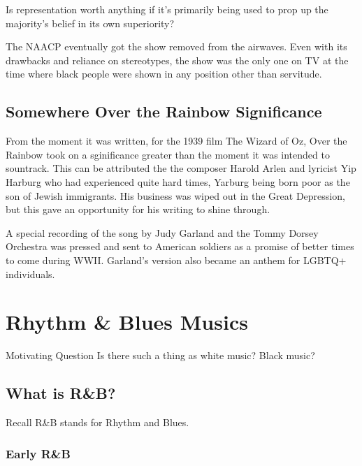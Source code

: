 \documentclass[12pt, a4paper, twoside, openright, titlepage]{book}
\begin{document}
\begin{qst}{}{}
    Is representation worth anything if it's primarily being used to prop up the majority's belief in its own superiority?
\end{qst}

The NAACP eventually got the show removed from the airwaves. Even with its drawbacks and reliance on stereotypes, the show was the only one on TV at the time where black people were shown in any position other than servitude.





\section{Somewhere Over the Rainbow Significance}

From the moment it was written, for the 1939 film The Wizard of Oz, Over the Rainbow took on a sginificance greater than the moment it was intended to sountrack. This can be attributed the the composer Harold Arlen and lyricist Yip Harburg who had experienced quite hard times, Yarburg being born poor as the son of Jewish immigrants. His business was wiped out in the Great Depression, but this gave an opportunity for his writing to shine through.

A special recording of the song by Judy Garland and the Tommy Dorsey Orchestra was pressed and sent to American soldiers as a promise of better times to come during WWII. Garland's version also became an anthem for LGBTQ+ individuals.



\chapter{Rhythm \& Blues Musics}


\begin{qst}{Motivating Question}{}
    Is there such a thing as white music? Black music?
\end{qst}

\section{What is R\&B?}


Recall R\&B stands for Rhythm and Blues.

\subsection{Early R\&B}
\end{document}
